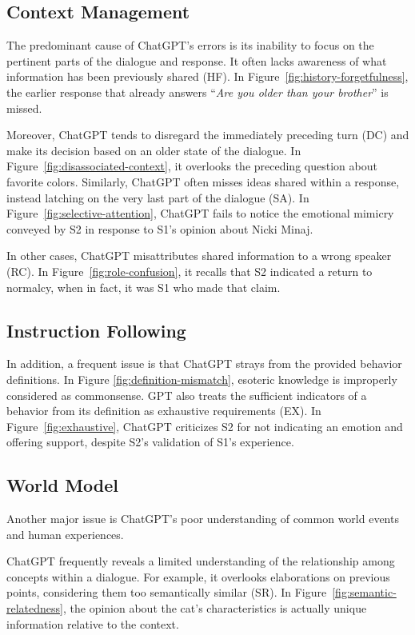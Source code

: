 \subsection{Context Management}

The predominant cause of ChatGPT's errors is its inability to focus on the pertinent parts of the dialogue and response. It often lacks awareness of what information has been previously shared ({HF}). In Figure~\ref{fig:history-forgetfulness}, the earlier response that already answers ``\textit{Are you older than your brother}'' is missed.

 Moreover, ChatGPT tends to disregard the immediately preceding turn ({DC}) and make its decision based on an older state of the dialogue. In Figure~\ref{fig:disassociated-context}, it overlooks the preceding question about favorite colors. Similarly, ChatGPT often misses ideas shared within a response, instead latching on the very last part of the dialogue ({SA}). In Figure~\ref{fig:selective-attention}, ChatGPT fails to notice the emotional mimicry conveyed by S2 in response to S1's opinion about Nicki Minaj.

 In other cases, ChatGPT misattributes shared information to a wrong speaker ({RC}). In Figure~\ref{fig:role-confusion}, it recalls that S2 indicated a return to normalcy, when in fact, it was S1 who made that claim.

\subsection{Instruction Following}

In addition, a frequent issue is that ChatGPT strays from the provided behavior definitions. In Figure \ref{fig:definition-mismatch}, esoteric knowledge is improperly considered as commonsense. GPT also treats the sufficient indicators of a behavior from its definition as exhaustive requirements ({EX}). In Figure~\ref{fig:exhaustive}, ChatGPT criticizes S2 for not indicating an emotion and offering support, despite S2's validation of S1's experience.

\subsection{World Model}

Another major issue is ChatGPT's poor understanding of common world events and human experiences.

ChatGPT frequently reveals a limited understanding of the relationship among concepts within a dialogue. For example, it overlooks elaborations on previous points, considering them too semantically similar (SR). In Figure~\ref{fig:semantic-relatedness}, the opinion about the cat's characteristics is actually unique information relative to the context.

